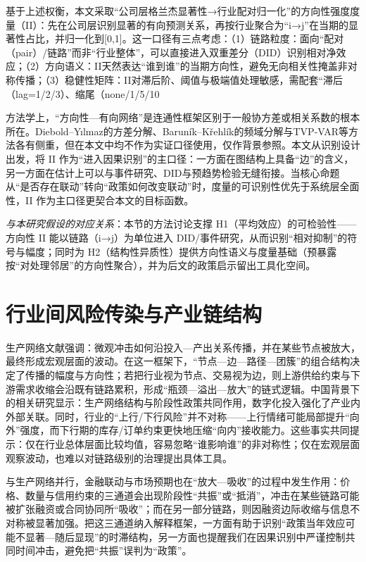基于上述权衡，本文采取“公司层格兰杰显著性→行业配对归一化”的方向性强度度量（II）：先在公司层识别显著的有向预测关系，再按行业聚合为“i→j”在当期的显著性占比，并归一化到[0,1]。这一口径有三点考虑：（1）链路粒度：面向“配对（pair）/链路”而非“行业整体”，可以直接进入双重差分（DID）识别相对净效应；（2）方向语义：II天然表达“谁到谁”的当期方向性，避免无向相关性掩盖非对称传播；（3）稳健性矩阵：II对滞后阶、阈值与极端值处理敏感，需配套“滞后（lag=1/2/3）、缩尾（none/1/5/10%

方法学上，“方向性—有向网络”是连通性框架区别于一般协方差或相关系数的根本所在。Diebold–Yılmaz的方差分解、Baruník–Křehlík的频域分解与TVP‑VAR等方法各有侧重，但在本文中均不作为实证口径使用，仅作背景参照。本文从识别设计出发，将 II 作为“进入因果识别”的主口径：一方面在图结构上具备“边”的含义，另一方面在估计上可以与事件研究、DID与预趋势检验无缝衔接。当核心命题从“是否存在联动”转向“政策如何改变联动”时，度量的可识别性优先于系统层全面性，II 作为主口径更契合本文的目标函数。

\noindent\textit{与本研究假设的对应关系}：本节的方法讨论支撑 H1（平均效应）的可检验性——方向性 II 能以链路（i→j）为单位进入 DID/事件研究，从而识别“相对抑制”的符号与幅度；同时为 H2（结构性异质性）提供方向性语义与度量基础（预暴露按“对处理邻居”的方向性聚合），并为后文的政策启示留出工具化空间。
\section{行业间风险传染与产业链结构}
生产网络文献强调：微观冲击如何沿投入—产出关系传播，并在某些节点被放大，最终形成宏观层面的波动\citep{acemoglu2012network,carvalho2014micro}。在这一框架下，“节点—边—路径—团簇”的组合结构决定了传播的幅度与方向性；若把行业视为节点、交易视为边，则上游供给约束与下游需求收缩会沿既有链路累积，形成“瓶颈—溢出—放大”的链式逻辑。中国背景下的相关研究显示：生产网络结构与阶段性政策共同作用，数字化投入强化了产业内外部关联\citep{Zhao2023DigitalInputNetwork}。同时，行业的“上行/下行风险”并不对称——上行情绪可能局部提升“向外”强度，而下行期的库存/订单约束更快地压缩“向内”接收能力\citep{Li2024UpsideDownsideSpillover}。这些事实共同提示：仅在行业总体层面比较均值，容易忽略“谁影响谁”的非对称性；仅在宏观层面观察波动，也难以对链路级别的治理提出具体工具。

与生产网络并行，金融联动与市场预期也在“放大—吸收”的过程中发生作用：价格、数量与信用约束的三通道会出现阶段性“共振”或“抵消”，冲击在某些链路可能被扩张融资或合同协同所“吸收”；而在另一部分链路，则因融资边际收缩与信息不对称被显著加强。把这三通道纳入解释框架，一方面有助于识别“政策当年效应可能不显著—随后显现”的时滞结构，另一方面也提醒我们在因果识别中严谨控制共同时间冲击，避免把“共振”误判为“政策”。

